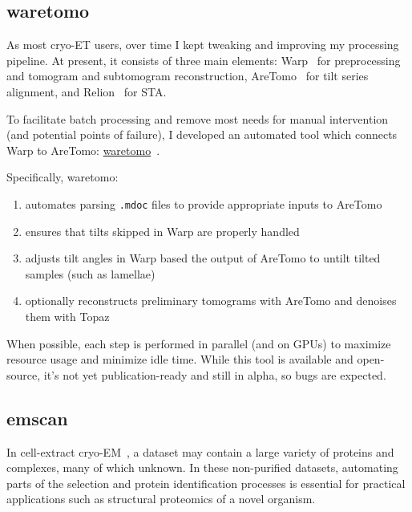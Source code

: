 \subsection{waretomo}\label{waretomo}

As most cryo-ET users, over time I kept tweaking and improving my processing pipeline.
At present, it consists of three main elements: Warp~\cite{tegunovRealtimeCryoelectronMicroscopy2019} for preprocessing and tomogram and subtomogram reconstruction, AreTomo~\cite{zhengAreTomoIntegratedSoftware2022} for tilt series alignment, and Relion~\cite{scheresRELIONImplementationBayesian2012,zivanovBayesianApproachSingleparticle2022,burtImageProcessingPipeline2024} for STA.

To facilitate batch processing and remove most needs for manual intervention (and potential points of failure), I developed an automated tool which connects Warp to AreTomo: \href{https://gihub.com/brisvag/waretomo}{waretomo}~\cite{gaifasWaretomo2024}.

Specifically, waretomo:
\begin{enumerate}[noitemsep]
    \item automates parsing \texttt{.mdoc} files to provide appropriate inputs to AreTomo
    \item ensures that tilts skipped in Warp are properly handled
    \item adjusts tilt angles in Warp based the output of AreTomo to untilt tilted samples (such as lamellae)
    \item optionally reconstructs preliminary tomograms with AreTomo and denoises them with Topaz~\cite{beplerTopazDenoiseGeneralDeep2020}
\end{enumerate}

When possible, each step is performed in parallel (and on GPUs) to maximize resource usage and minimize idle time.
While this tool is available and open-source, it's not yet publication-ready and still in alpha, so bugs are expected.

\subsection{emscan}\label{emscan}

In cell-extract cryo-EM~\cite{suBuildRetrieveMethodology2021,kyrilisIntegrativeBiologyNative2019}, a dataset may contain a large variety of proteins and complexes, many of which unknown.
In these non-purified datasets, automating parts of the selection and protein identification processes is essential for practical applications such as structural proteomics of a novel organism.

